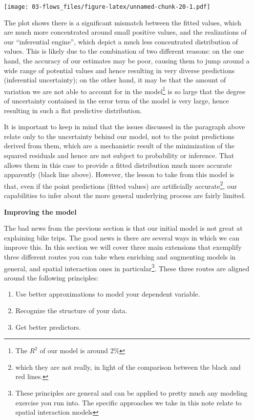 \documentclass[]{book}
\providecommand{\tightlist}{%
  \setlength{\itemsep}{0pt}\setlength{\parskip}{0pt}}
\begin{document}
\texttt{[image: 03-flows\_files/figure-latex/unnamed-chunk-20-1.pdf]}

The plot shows there is a significant mismatch between the fitted
values, which are much more concentrated around small positive values,
and the realizations of our ``inferential engine'', which depict a much
less concentrated distribution of values. This is likely due to the
combination of two different reasons: on the one hand, the accuracy of
our estimates may be poor, causing them to jump around a wide range of
potential values and hence resulting in very diverse predictions
(inferential uncertainty); on the other hand, it may be that the amount
of variation we are not able to account for in the model\footnote{The
  \(R^2\) of our model is around 2\%} is so large that the degree of
uncertainty contained in the error term of the model is very large,
hence resulting in such a flat predictive distribution.

It is important to keep in mind that the issues discussed in the
paragraph above relate only to the uncertainty behind our model, not to
the point predictions derived from them, which are a mechanistic result
of the minimization of the squared residuals and hence are not subject
to probability or inference. That allows them in this case to provide a
fitted distribution much more accurate apparently (black line above).
However, the lesson to take from this model is that, even if the point
predictions (fitted values) are artificially accurate\footnote{which
  they are not really, in light of the comparison between the black and
  red lines.}, our capabilities to infer about the more general
underlying process are fairly limited.

\textbf{Improving the model}

The bad news from the previous section is that our initial model is not
great at explaining bike trips. The good news is there are several ways
in which we can improve this. In this section we will cover three main
extensions that exemplify three different routes you can take when
enriching and augmenting models in general, and spatial interaction ones
in particular\footnote{These principles are general and can be applied
  to pretty much any modeling exercise you run into. The specific
  approaches we take in this note relate to spatial interaction models}.
These three routes are aligned around the following principles:

\begin{enumerate}
\def\labelenumi{\arabic{enumi}.}
\tightlist
\item
  Use better approximations to model your dependent variable.
\item
  Recognize the structure of your data.
\item
  Get better predictors.
\end{enumerate}
\end{document}
